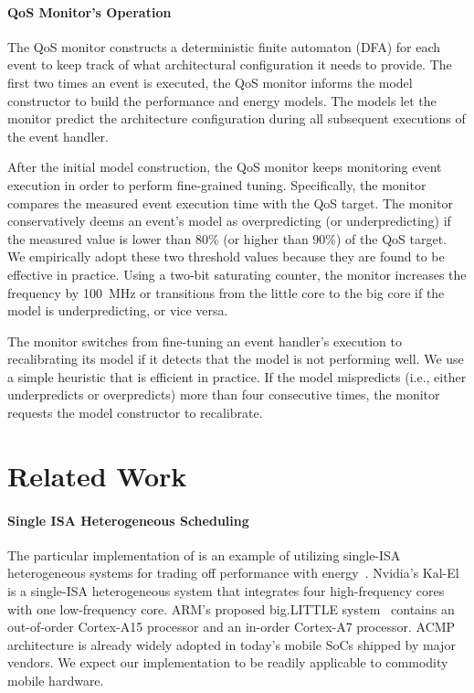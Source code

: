 \paragraph{QoS Monitor's Operation} The QoS monitor constructs a deterministic finite automaton (DFA) for each event to keep track of what architectural configuration it needs to provide. The first two times an event is executed, the QoS monitor informs the model constructor to build the performance and energy models. The models let the monitor predict the architecture configuration during all subsequent executions of the event handler.

After the initial model construction, the QoS monitor keeps monitoring event execution in order to perform fine-grained tuning. Specifically, the monitor compares the measured event execution time with the QoS target. The monitor conservatively deems an event's model as overpredicting (or underpredicting) if the measured value is lower than 80\% (or higher than 90\%) of the QoS target. We empirically adopt these two threshold values because they are found to be effective in practice. Using a two-bit saturating counter, the monitor increases the frequency by 100~MHz or transitions from the little core to the big core if the model is underpredicting, or vice versa.

The monitor switches from fine-tuning an event handler's execution to recalibrating its model if it detects that the model is not performing well. We use a simple heuristic that is efficient in practice. If the model mispredicts (i.e., either underpredicts or overpredicts) more than four consecutive times, the monitor requests the model constructor to recalibrate.

\section{Related Work}
\label{sec:runtime:related}

\paragraph{Single ISA Heterogeneous Scheduling} The particular implementation of \webrt is an example of utilizing single-ISA heterogeneous systems for trading off performance with energy~\cite{single-ISA}. Nvidia's Kal-El~\cite{Tegra3} is a single-ISA heterogeneous system that integrates four high-frequency cores with one low-frequency core. ARM's proposed big.LITTLE system~\cite{big.little} contains an out-of-order Cortex-A15 processor and an in-order Cortex-A7 processor. ACMP architecture is already widely adopted in today's mobile SoCs shipped by major vendors. We expect our \webrt implementation to be readily applicable to commodity mobile hardware.

